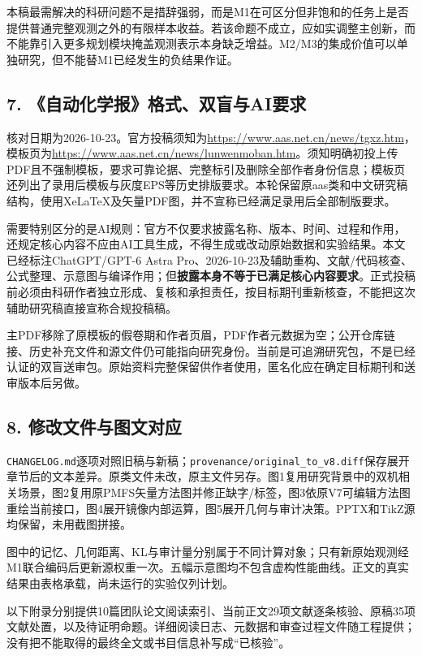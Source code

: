 本稿最需解决的科研问题不是措辞强弱，而是M1在可区分但非饱和的任务上是否提供普通完整观测之外的有限样本收益。若该命题不成立，应如实调整主创新，而不能靠引入更多规划模块掩盖观测表示本身缺乏增益。M2/M3的集成价值可以单独研究，但不能替M1已经发生的负结果作证。

\hypertarget{ux81eaux52a8ux5316ux5b66ux62a5ux683cux5f0fux53ccux76f2ux4e0eaiux8981ux6c42}{%
\subsection{7.
《自动化学报》格式、双盲与AI要求}\label{ux81eaux52a8ux5316ux5b66ux62a5ux683cux5f0fux53ccux76f2ux4e0eaiux8981ux6c42}}

核对日期为2026-10-23。官方投稿须知为\url{https://www.aas.net.cn/news/tgxz.htm}，模板页为\url{https://www.aas.net.cn/news/lunwenmoban.htm}。须知明确初投上传PDF且不强制模板，要求可靠论据、完整标引及删除全部作者身份信息；模板页还列出了录用后模板与灰度EPS等历史排版要求。本轮保留原aas类和中文研究稿结构，使用XeLaTeX及矢量PDF图，并不宣称已经满足录用后全部制版要求。

需要特别区分的是AI规则：官方不仅要求披露名称、版本、时间、过程和作用，还规定核心内容不应由AI工具生成，不得生成或改动原始数据和实验结果。本文已经标注ChatGPT/GPT-6
Astra
Pro、2026-10-23及辅助重构、文献/代码核查、公式整理、示意图与编译作用；但\textbf{披露本身不等于已满足核心内容要求}。正式投稿前必须由科研作者独立形成、复核和承担责任，按目标期刊重新核查，不能把这次辅助研究稿直接宣称合规投稿稿。

主PDF移除了原模板的假卷期和作者页眉，PDF作者元数据为空；公开仓库链接、历史补充文件和源文件仍可能指向研究身份。当前是可追溯研究包，不是已经认证的双盲送审包。原始资料完整保留供作者使用，匿名化应在确定目标期刊和送审版本后另做。

\hypertarget{ux4feeux6539ux6587ux4ef6ux4e0eux56feux6587ux5bf9ux5e94}{%
\subsection{8.
修改文件与图文对应}\label{ux4feeux6539ux6587ux4ef6ux4e0eux56feux6587ux5bf9ux5e94}}

\nolinkurl{CHANGELOG.md}逐项对照旧稿与新稿；\nolinkurl{provenance/original_to_v8.diff}保存展开章节后的文本差异。原类文件未改，原主文件另存。图1复用研究背景中的双机相关场景，图2复用原PMFS矢量方法图并修正缺字/标签，图3依原V7可编辑方法图重绘当前接口，图4展开镜像内部运算，图5展开几何与审计决策。PPTX和TikZ源均保留，未用截图拼接。

图中的记忆、几何距离、KL与审计量分别属于不同计算对象；只有新原始观测经M1联合编码后更新源权重一次。五幅示意图均不包含虚构性能曲线。正文的真实结果由表格承载，尚未运行的实验仅列计划。

以下附录分别提供10篇团队论文阅读索引、当前正文29项文献逐条核验、原稿35项文献处置，以及待证明命题。详细阅读日志、元数据和审查过程文件随工程提供；没有把不能取得的最终全文或书目信息补写成``已核验''。
